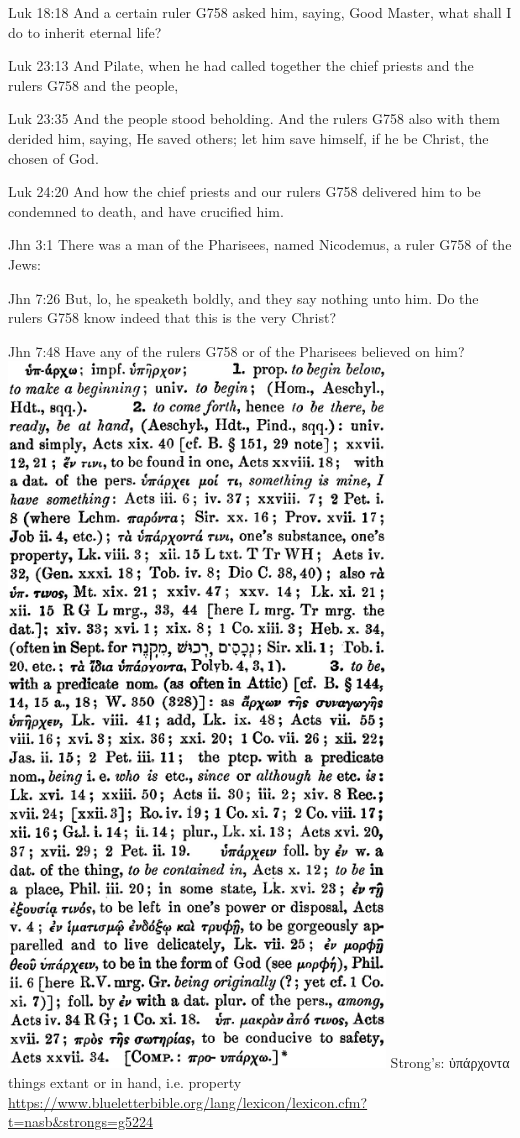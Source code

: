 \documentclass[11pt]{article}
\begin{document}
\begin{thebibliography}{37}
 Luk 18:18
And a certain ruler G758 asked him, saying, Good Master, what shall I do to inherit eternal life?

 Luk 23:13
And Pilate, when he had called together the chief priests and the rulers G758 and the people,

 Luk 23:35
And the people stood beholding. And the rulers G758 also with them derided him, saying, He saved others; let him save himself, if he be Christ, the chosen of God.

 Luk 24:20
And how the chief priests and our rulers G758 delivered him to be condemned to death, and have crucified him.

 Jhn 3:1
There was a man of the Pharisees, named Nicodemus, a ruler G758 of the Jews:

 Jhn 7:26
But, lo, he speaketh boldly, and they say nothing unto him. Do the rulers G758 know indeed that this is the very Christ?

 Jhn 7:48
Have any of the rulers G758 or of the Pharisees believed on him?
\includegraphics[width=10cm]{possessions}
Strong's:
ὑπάρχοντα
things extant or in hand, i.e. property 
\url{https://www.blueletterbible.org/lang/lexicon/lexicon.cfm?t=nasb&strongs=g5224}


\end{thebibliography}
\end{document}
